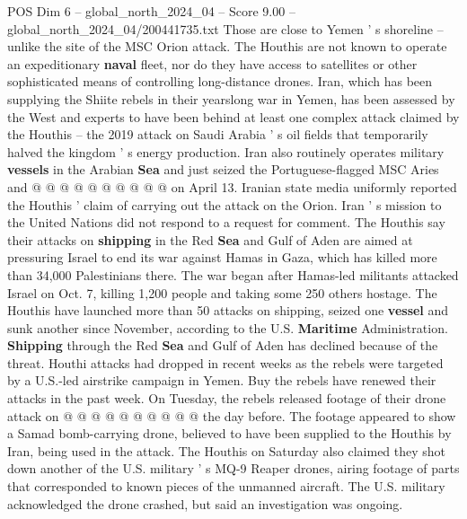 \begin{textsample}{POS Dim 6 – global\_north\_2024\_04 – Score 9.00 – global\_north\_2024\_04/200441735.txt}
Those are close to Yemen ' s shoreline -- unlike the site of the MSC Orion attack.
The Houthis are not known to operate an expeditionary \textbf{naval} fleet, nor do they have access to satellites or other sophisticated means of controlling long-distance drones.
Iran, which has been supplying the Shiite rebels in their yearslong war in Yemen, has been assessed by the West and experts to have been behind at least one complex attack claimed by the Houthis -- the 2019 attack on Saudi Arabia ' s oil fields that temporarily halved the kingdom ' s energy production.
Iran also routinely operates military \textbf{vessels} in the Arabian \textbf{Sea} and just seized the Portuguese-flagged MSC Aries and @ @ @ @ @ @ @ @ @ @ on April 13.
Iranian state media uniformly reported the Houthis ' claim of carrying out the attack on the Orion.
Iran ' s mission to the United Nations did not respond to a request for comment.
The Houthis say their attacks on \textbf{shipping} in the Red \textbf{Sea} and Gulf of Aden are aimed at pressuring Israel to end its war against Hamas in Gaza, which has killed more than 34,000 Palestinians there.
The war began after Hamas-led militants attacked Israel on Oct. 7, killing 1,200 people and taking some 250 others hostage.
The Houthis have launched more than 50 attacks on shipping, seized one \textbf{vessel} and sunk another since November, according to the U.S. \textbf{Maritime} Administration. \textbf{Shipping} through the Red \textbf{Sea} and Gulf of Aden has declined because of the threat.
Houthi attacks had dropped in recent weeks as the rebels were targeted by a U.S.-led airstrike campaign in Yemen.
Buy the rebels have renewed their attacks in the past week.
On Tuesday, the rebels released footage of their drone attack on @ @ @ @ @ @ @ @ @ @ the day before.
The footage appeared to show a Samad bomb-carrying drone, believed to have been supplied to the Houthis by Iran, being used in the attack.
The Houthis on Saturday also claimed they shot down another of the U.S. military ' s MQ-9 Reaper drones, airing footage of parts that corresponded to known pieces of the unmanned aircraft.
The U.S. military acknowledged the drone crashed, but said an investigation was ongoing.

\end{textsample}
